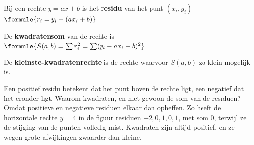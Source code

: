 \begin{theorie}
Bij een rechte $y = ax + b$ is het \textbf{\textcolor{accent}{residu}} van het punt $(x_i, y_i)$ \qquad $\formule{r_i = y_i - (ax_i + b)}$

\vspace{1mm}
De \textbf{\textcolor{accent}{kwadratensom}} van de rechte is \qquad $\formule{S(a, b) = \sum r_i^2 = \sum (y_i - ax_i - b)^2}$

\vspace{1mm}
De \textbf{\textcolor{accent}{kleinste-kwadratenrechte}} is de rechte waarvoor $S(a, b)$ zo klein mogelijk is.
\end{theorie}

Een positief residu betekent dat het punt boven de rechte ligt, een negatief dat het eronder ligt. Waarom kwadraten, en niet gewoon de som van de residuen? Omdat positieve en negatieve residuen elkaar dan opheffen. Zo heeft de horizontale rechte $y = 4$ in de figuur residuen $-2, 0, 1, 0, 1$, met som $0$, terwijl ze de stijging van de punten volledig mist. Kwadraten zijn altijd positief, en ze wegen grote afwijkingen zwaarder dan kleine.


\begin{oefeningen}
\end{oefeningen}

